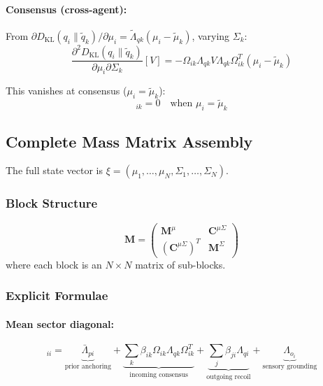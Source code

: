 \documentclass[12pt]{article}
\begin{document}
\paragraph{Consensus (cross-agent):} From $\partial D_{\mathrm{KL}}(q_i \| \tilde{q}_k)/\partial \mu_i = \tilde{\Lambda}_{qk}(\mu_i - \tilde{\mu}_k)$, varying $\Sigma_k$:
\begin{equation}
\frac{\partial^2 D_{\mathrm{KL}}(q_i \| \tilde{q}_k)}{\partial \mu_i \partial \Sigma_k}[V] = -\Omega_{ik}\Lambda_{qk}V\Lambda_{qk}\Omega_{ik}^T(\mu_i - \tilde{\mu}_k)
\end{equation}

This vanishes at consensus ($\mu_i = \tilde{\mu}_k$):
\begin{equation}
[\mathbf{C}^{\mu\Sigma}]_{ik} = 0 \quad \text{when } \mu_i = \tilde{\mu}_k
\end{equation}

\subsection{Complete Mass Matrix Assembly}

The full state vector is $\xi = (\mu_1, \ldots, \mu_N, \Sigma_1, \ldots, \Sigma_N)$.

\subsubsection{Block Structure}

\begin{equation}
\mathbf{M} = \begin{pmatrix} \mathbf{M}^\mu & \mathbf{C}^{\mu\Sigma} \\ (\mathbf{C}^{\mu\Sigma})^T & \mathbf{M}^\Sigma \end{pmatrix}
\end{equation}
where each block is an $N \times N$ matrix of sub-blocks.

\subsubsection{Explicit Formulae}

\paragraph{Mean sector diagonal:}
\begin{equation}
[\mathbf{M}^\mu]_{ii} = \underbrace{\bar{\Lambda}_{pi}}_{\text{prior anchoring}} + \underbrace{\sum_k \beta_{ik}\Omega_{ik}\Lambda_{qk}\Omega_{ik}^T}_{\text{incoming consensus}} + \underbrace{\sum_j \beta_{ji}\Lambda_{qi}}_{\text{outgoing recoil}} + \underbrace{\Lambda_{o_i}}_{\text{sensory grounding}}
\label{eq:mass_full_diagonal}
\end{equation}
\end{document}
